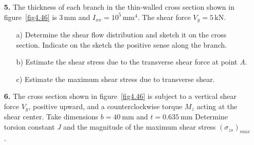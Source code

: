 \documentclass{AeroStructure-ERJohnson}
\begin{document}
\begin{exercise}
\begin{enumerate}[\textbf{2.}]
\begin{table}[h]%
\end{table}


\item[\textbf{5.}]  The thickness of each branch in the thin-walled cross section shown in figure~\ref{fig4.46} is 3\,mm and $I_{x x}=10^{5}\,\textrm{mm}^{4}$. The shear force $V_{y}=5\,\textrm{kN}$.





\begin{enumerate}[b)]
  \item[a)] Determine the shear flow distribution and sketch it on the cross section. Indicate on the sketch the positive sense along the branch.
  \item[b)] Estimate the shear stress due to the transverse shear force at point \textit{A}.
  \item[c)] Estimate the maximum shear stress due to transverse shear.
\end{enumerate}


\item[\textbf{6.}]  The cross section shown in figure~\ref{fig4.46} is subject to a vertical shear force $V_{y}$, positive upward, and a counterclockwise torque $M_{z}$ acting at the shear center. Take dimensions $b=40~\mathrm{mm}$ and $t=0.635~\mathrm{mm}$ Determine torsion constant \textit{J} and the magnitude of the maximum shear stress $\left(\sigma_{z s}\right)_{max}$.

{\def\thefigure{4.46}
}


\end{enumerate}
\end{exercise}
\end{document}
